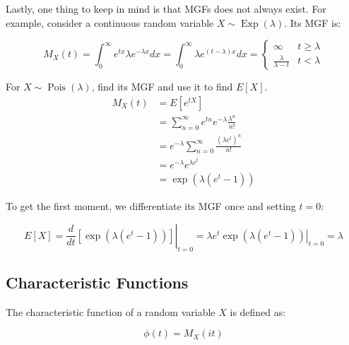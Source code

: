 \documentclass[12pt, a4paper]{article}
\newcounter{exa}
\newcommand{\Pois}{\operatorname{Pois}}
\newcommand{\Exp}{\operatorname{Exp}}
\begin{document}
Lastly, one thing to keep in mind is that MGFs does not always exist. For example, consider a continuous random variable $X\sim\Exp(\lambda)$. Its MGF is:

\[M_X(t)=\int_0^\infty e^{tx} \lambda e^{-\lambda x} dx=\int_0^\infty \lambda e^{(t-\lambda)x} dx=\begin{cases} \infty & t \ge \lambda \\ \frac{\lambda}{\lambda-t} & t<\lambda \end{cases}\]

\begin{texample}
For $X\sim\Pois(\lambda)$, find its MGF and use it to find $E[X]$. \\

\begin{align*}
M_X(t)&=E[e^{tX}] \\
&=\sum_{n=0}^\infty e^{tn} e^{-\lambda} \frac{\lambda^n}{n!} \\
&=e^{-\lambda} \sum_{n=0}^\infty \frac{(\lambda e^t)^n}{n!} \\
&=e^{-\lambda}e^{\lambda e^t} \\
&=\exp(\lambda (e^t-1))
\end{align*}

To get the first moment, we differentiate its MGF once and setting $t=0$:

\[E[X]=\left.\frac{d}{dt}\left[\exp(\lambda (e^t-1))\right]\right\vert_{t=0}=\left.\lambda e^t\exp(\lambda (e^t-1))\right\vert_{t=0}=\lambda\]
\end{texample}

\subsection{Characteristic Functions}

The characteristic function of a random variable $X$ is defined as:

\[\phi(t)=M_X(it)\]
\end{document}
